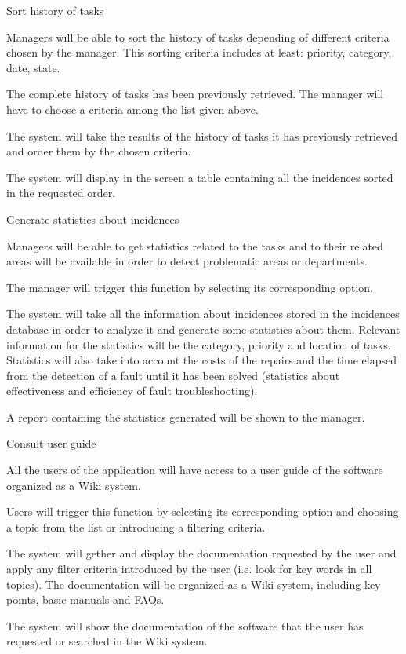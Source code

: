 \begin{requirement}{Sort history of tasks}

\reqdesc Managers will be able to sort the history of tasks depending of different criteria chosen by the manager. This sorting criteria includes at least: priority, category, date, state.

\reqin The complete history of tasks has been previously retrieved. The manager will have to choose a criteria among the list given above.

\reqsteps The system will take the results of the history of tasks it has previously retrieved and order them by the chosen criteria.

\reqout The system will display in the screen a table containing all the incidences sorted in the requested order.

\end{requirement}


\begin{requirement}{Generate statistics about incidences}

\reqdesc Managers will be able to get statistics related to the tasks and to their related areas will be available in order to
detect problematic areas or departments.

\reqin The manager will trigger this function by selecting its corresponding option.

\reqsteps The system will take all the information about incidences stored in the incidences database in order to analyze it and generate some statistics about them. Relevant information for the statistics will be the category, priority and location of tasks. Statistics will also take into account the costs of the repairs and the time elapsed from the detection of a fault until it has been solved (statistics about effectiveness and efficiency of fault troubleshooting).

\reqout A report containing the statistics generated will be shown to the manager.

\end{requirement}



\begin{requirement}{Consult user guide}

\reqdesc All the users of the application will have access to a user guide of the software organized as a Wiki system. 

\reqin Users will trigger this function by selecting its corresponding option and choosing a topic from the list or introducing a filtering criteria. 

\reqsteps The system will gether and display the documentation requested by the user and apply any filter criteria introduced by the user (i.e. look for key words in all topics). The documentation will be organized as a Wiki system, including key points, basic manuals and FAQs.

\reqout The system will show the documentation of the software that the user has requested or searched in the Wiki system.

\end{requirement}


